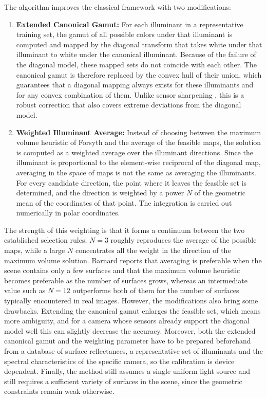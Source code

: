 The algorithm improves the classical framework with two modifications:
\begin{enumerate}
\item \textbf{Extended Canonical Gamut:} For each illuminant in a representative training set, the gamut of all possible colors under that illuminant is computed and mapped by the diagonal transform that takes white under that illuminant to white under the canonical illuminant. Because of the failure of the diagonal model, these mapped sets do not coincide with each other. The canonical gamut is therefore replaced by the convex hull of their union, which guarantees that a diagonal mapping always exists for these illuminants and for any convex combination of them. Unlike sensor sharpening \cite{diagonal_chromatography}, this is a robust correction that also covers extreme deviations from the diagonal model.
\item \textbf{Weighted Illuminant Average:} Instead of choosing between the maximum volume heuristic of Forsyth \cite{baseofgamut} and the average of the feasible maps, the solution is computed as a weighted average over the illuminant directions. Since the illuminant is proportional to the element-wise reciprocal of the diagonal map, averaging in the space of maps is not the same as averaging the illuminants. For every candidate direction, the point where it leaves the feasible set is determined, and the direction is weighted by a power $N$ of the geometric mean of the coordinates of that point. The integration is carried out numerically in polar coordinates.
\end{enumerate}

The strength of this weighting is that it forms a continuum between the two established selection rules; $N=3$ roughly reproduces the average of the possible maps, while a large $N$ concentrates all the weight in the direction of the maximum volume solution. Barnard reports that averaging is preferable when the scene contains only a few surfaces and that the maximum volume heuristic becomes preferable as the number of surfaces grows, whereas an intermediate value such as $N=12$ outperforms both of them for the number of surfaces typically encountered in real images. However, the modifications also bring some drawbacks. Extending the canonical gamut enlarges the feasible set, which means more ambiguity, and for a camera whose sensors already support the diagonal model well this can slightly decrease the accuracy. Moreover, both the extended canonical gamut and the weighting parameter have to be prepared beforehand from a database of surface reflectances, a representative set of illuminants and the spectral characteristics of the specific camera, so the calibration is device dependent. Finally, the method still assumes a single uniform light source and still requires a sufficient variety of surfaces in the scene, since the geometric constraints remain weak otherwise.

